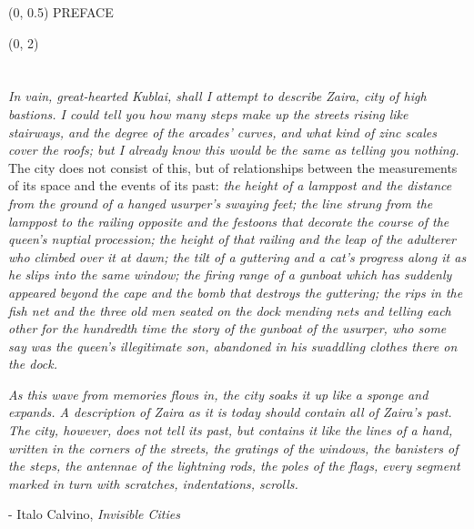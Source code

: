 \documentclass[11pt]{article}
\begin{document}
\scriptsize

\begin{textblock}{23} (0, 0.5)
\center\huge PREFACE
\end{textblock}

\begin{textblock}{11} (0, 2)

\section{}

\textit{In vain, great-hearted Kublai, shall I attempt to describe Zaira, city
of high bastions. I could tell you how many steps make up the streets rising
like stairways, and the degree of the arcades' curves, and what kind of zinc
scales cover the roofs; but I already know this would be the same as telling
you nothing.} The city does not consist of this, but of relationships between
the measurements of its space and the events of its past: \textit{the height of
a lamppost and the distance from the ground of a hanged usurper's swaying feet;
the line strung from the lamppost to the railing opposite and the festoons that
decorate the course of the queen's nuptial procession; the height of that
railing and the leap of the adulterer who climbed over it at dawn; the tilt of
a guttering and a cat's progress along it as he slips into the same window; the
firing range of a gunboat which has suddenly appeared beyond the cape and the
bomb that destroys the guttering; the rips in the fish net and the three old
men seated on the dock mending nets and telling each other for the hundredth
time the story of the gunboat of the usurper, who some say was the queen's
illegitimate son, abandoned in his swaddling clothes there on the dock.}

\textit{As this wave from memories flows in, the city soaks it up like a sponge
and expands. A description of Zaira as it is today should contain all of
Zaira's past. The city, however, does not tell its past, but contains it like
the lines of a hand, written in the corners of the streets, the gratings of the
windows, the banisters of the steps, the antennae of the lightning rods, the
poles of the flags, every segment marked in turn with scratches, indentations,
scrolls. }

- Italo Calvino, \emph{Invisible Cities}

\end{textblock}
\end{document}

